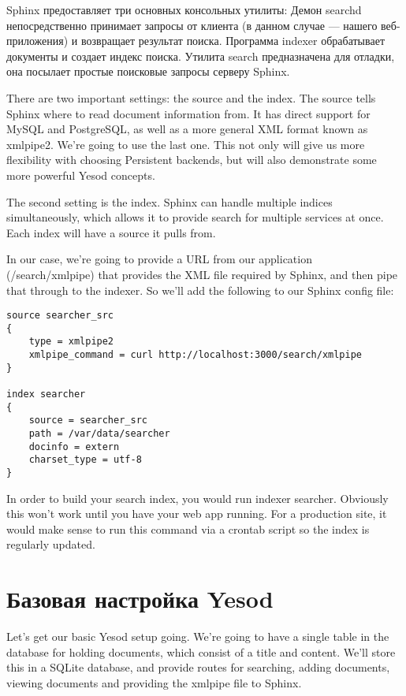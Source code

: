 Sphinx предоставляет три основных консольных утилиты: Демон searchd непосредственно принимает запросы от клиента (в данном случае --- нашего веб-приложения) и возвращает результат поиска. Программа indexer обрабатывает документы и создает индекс поиска. Утилита search предназначена для отладки, она посылает простые поисковые запросы серверу Sphinx.

There are two important settings: the source and the index. The source tells Sphinx where to read document information from. It has direct support for MySQL and PostgreSQL, as well as a more general XML format known as xmlpipe2. We're going to use the last one. This not only will give us more flexibility with choosing Persistent backends, but will also demonstrate some more powerful Yesod concepts.

The second setting is the index. Sphinx can handle multiple indices simultaneously, which allows it to provide search for multiple services at once. Each index will have a source it pulls from.

In our case, we're going to provide a URL from our application (/search/xmlpipe) that provides the XML file required by Sphinx, and then pipe that through to the indexer. So we'll add the following to our Sphinx config file:

\begin{lstlisting}
source searcher_src
{
    type = xmlpipe2
    xmlpipe_command = curl http://localhost:3000/search/xmlpipe
}

index searcher
{
    source = searcher_src
    path = /var/data/searcher
    docinfo = extern
    charset_type = utf-8
}
\end{lstlisting}

In order to build your search index, you would run indexer searcher. Obviously this won't work until you have your web app running. For a production site, it would make sense to run this command via a crontab script so the index is regularly updated.

\section{Базовая настройка Yesod} %

Let's get our basic Yesod setup going. We're going to have a single table in the database for holding documents, which consist of a title and content. We'll store this in a SQLite database, and provide routes for searching, adding documents, viewing documents and providing the xmlpipe file to Sphinx.

